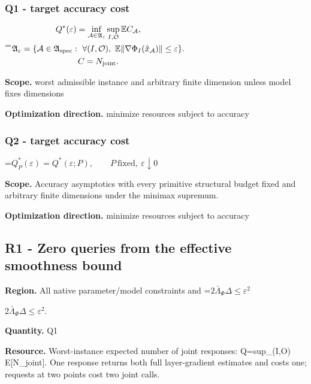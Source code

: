 \documentclass[10pt,a4paper]{article}
\newcommand{\AtlasMath}[1]{\par\begingroup\centering\setbox0=\hbox{$\displaystyle #1$}\ifdim\wd0>1.4\linewidth\typeout{ATLAS WIDE FORMULA: \the\wd0}\fi\ifdim\wd0>\linewidth\resizebox{\linewidth}{!}{\box0}\else\box0\fi\par\endgroup}
\newcommand{\AtlasInlineMath}[1]{\begingroup\setbox0=\hbox{$#1$}\ifdim\wd0>.4\linewidth\endgroup\AtlasMath{#1}\else\endgroup$#1$\fi}
\begin{document}
\subsubsection{Q1 - target accuracy cost}


\AtlasMath{\begin{gathered}Q^*(\varepsilon)=\inf_{\mathcal A\in\mathfrak A_\varepsilon}\sup_{I,\mathcal O}\mathbb E C_{\mathcal A},\\\mathfrak A_\varepsilon=\{\mathcal A\in\mathfrak A_{\rm spec}:\ \forall(I,\mathcal O),\ \mathbb E\|\nabla\Phi_I(\hat x_{\mathcal A})\|\le\varepsilon\}.\\C=N_{\mathrm{joint}}.\end{gathered}}


\textbf{Scope.} worst admissible instance and arbitrary finite dimension unless model fixes dimensions



\textbf{Optimization direction.} minimize resources subject to accuracy



\subsubsection{Q2 - target accuracy cost}


\AtlasMath{Q_P^*(\varepsilon)=Q^*(\varepsilon;P),\qquad P\ \mathrm{fixed},\ \varepsilon\downarrow0}


\textbf{Scope.} Accuracy asymptotics with every primitive structural budget fixed and arbitrary finite dimensions under the minimax supremum.



\textbf{Optimization direction.} minimize resources subject to accuracy



\subsection{R1 - Zero queries from the effective smoothness bound}


\textbf{Region.} All native parameter/model constraints and \AtlasInlineMath{2\bar\Lambda_\Phi\Delta\le\varepsilon^2}.



\textbf{Quantity.} Q1



\textbf{Resource.} Worst-instance expected number of joint responses: Q=sup\_(I,O) E[N\_joint]. One response returns both full layer-gradient estimates and costs one; requests at two points cost two joint calls.
\end{document}
